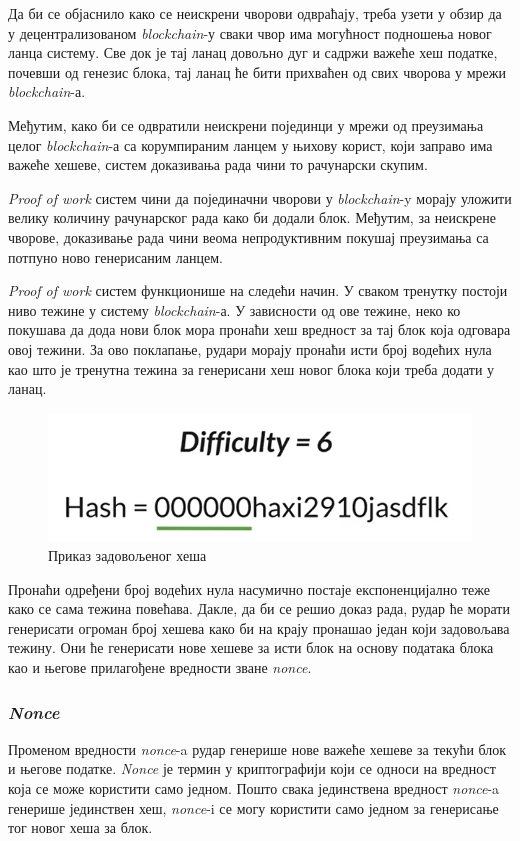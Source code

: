 \documentclass[12pt, a4paper]{article}
\begin{document}
Да би се објаснило како се неискрени чворови одвраћају, треба узети у обзир да у децентрализованом \textit{blockchain}-у сваки чвор има могућност подношења новог ланца систему. Све док је тај ланац довољно дуг и садржи важеће хеш податке, почевши од генезис блока, тај ланац ће бити прихваћен од свих чворова у мрежи \textit{blockchain}-а.

Међутим, како би се одвратили неискрени појединци у мрежи од преузимања целог \textit{blockchain}-а са корумпираним ланцем у њихову корист, који заправо има важеће хешеве, систем доказивања рада чини то рачунарски скупим.

\textit{Proof of work} систем чини да појединачни чворови у \textit{blockchain}-y морају уложити велику количину рачунарског рада како би додали блок. Међутим, за неискрене чворове, доказивање рада чини веома непродуктивним покушај преузимања са потпуно ново генерисаним ланцем.

\textit{Proof of work} систем функционише на следећи начин. У сваком тренутку постоји ниво тежине у систему \textit{blockchain}-а. У зависности од ове тежине, неко ко покушава да дода нови блок мора пронаћи хеш вредност за тај блок која одговара овој тежини. За ово поклапање, рудари морају пронаћи исти број водећих нула као што је тренутна тежина за генерисани хеш новог блока који треба додати у ланац.

\begin{figure}[h]
    \centering
    \includegraphics[width=0.5\linewidth]{slike/difficulty.png}
    \caption{Приказ задовољеног хеша}
    \label{fig:good-hash}
\end{figure}

Пронаћи одређени број водећих нула насумично постаје експоненцијално теже како се сама тежина повећава. Дакле, да би се решио доказ рада, рудар ће морати генерисати огроман број хешева како би на крају пронашао један који задовољава тежину. Они ће генерисати нове хешеве за исти блок на основу података блока као и његове прилагођене вредности зване \textit{nonce}.

\subsubsection{\textit{Nonce}}
Променом вредности \textit{nonce}-a рудар генерише нове важеће хешеве за текући блок и његове податке. \textit{Nonce} је термин у криптографији који се односи на вредност која се може користити само једном. Пошто свака јединствена вредност \textit{nonce}-a генерише јединствен хеш, \textit{nonce}-i се могу користити само једном за генерисање тог новог хеша за блок.
\end{document}
